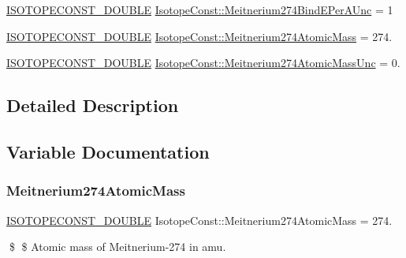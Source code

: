 \begin{DoxyCompactItemize}
\mbox{\hyperlink{group___isotope_const-_macros_ga8f45a7272ce02c0b4c65c44636ed719a}{I\+S\+O\+T\+O\+P\+E\+C\+O\+N\+S\+T\+\_\+\+D\+O\+U\+B\+LE}} \mbox{\hyperlink{group___isotope_const-_meitnerium-_mt274_ga4e6a7e5e4b7f3f6b26472a22eac33f03}{Isotope\+Const\+::\+Meitnerium274\+Bind\+E\+Per\+A\+Unc}} = 1
\item 
\mbox{\hyperlink{group___isotope_const-_macros_ga8f45a7272ce02c0b4c65c44636ed719a}{I\+S\+O\+T\+O\+P\+E\+C\+O\+N\+S\+T\+\_\+\+D\+O\+U\+B\+LE}} \mbox{\hyperlink{group___isotope_const-_meitnerium-_mt274_gaaf601f90b5377928db7bf9e9df3061a5}{Isotope\+Const\+::\+Meitnerium274\+Atomic\+Mass}} = 274.
\item 
\mbox{\hyperlink{group___isotope_const-_macros_ga8f45a7272ce02c0b4c65c44636ed719a}{I\+S\+O\+T\+O\+P\+E\+C\+O\+N\+S\+T\+\_\+\+D\+O\+U\+B\+LE}} \mbox{\hyperlink{group___isotope_const-_meitnerium-_mt274_ga4d8023665950632372f15cd5ac1a597c}{Isotope\+Const\+::\+Meitnerium274\+Atomic\+Mass\+Unc}} = 0.
\end{DoxyCompactItemize}


\subsection{Detailed Description}


\subsection{Variable Documentation}
\mbox{\label{group___isotope_const-_meitnerium-_mt274_gaaf601f90b5377928db7bf9e9df3061a5}} 
\subsubsection{\texorpdfstring{Meitnerium274\+Atomic\+Mass}{Meitnerium274AtomicMass}}
{\footnotesize\ttfamily \mbox{\hyperlink{group___isotope_const-_macros_ga8f45a7272ce02c0b4c65c44636ed719a}{I\+S\+O\+T\+O\+P\+E\+C\+O\+N\+S\+T\+\_\+\+D\+O\+U\+B\+LE}} Isotope\+Const\+::\+Meitnerium274\+Atomic\+Mass = 274.}

\$ \$ Atomic mass of Meitnerium-\/274 in amu. \mbox{\label{group___isotope_const-_meitnerium-_mt274_ga4d8023665950632372f15cd5ac1a597c}} 
